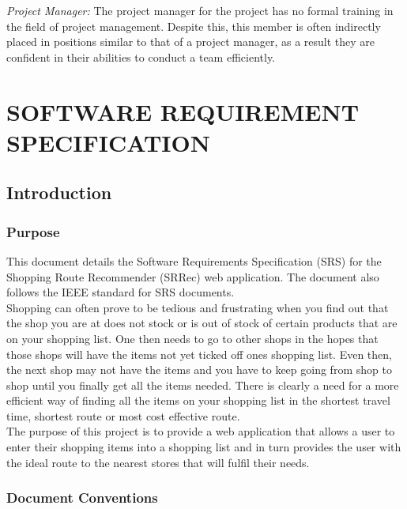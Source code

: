 \documentclass[10pt,twocolumn]{witseiepaper}
\begin{document}
		\textit{Project Manager:} The project manager for the project has no formal training in the field of project management. Despite this, this member is often indirectly placed in positions similar to that of a project manager, as a result they are confident in their abilities to conduct a team efficiently. \\

\section{SOFTWARE REQUIREMENT SPECIFICATION}
	
		\subsection{Introduction}
		
		\subsubsection{Purpose}
		
		This document details the Software Requirements Specification (SRS) for the Shopping Route Recommender (SRRec) web application. The document also follows the IEEE standard for SRS documents.\\
		
		Shopping can often prove to be tedious and frustrating when you find out that the shop you are at does not stock or is out of stock of certain products that are on your shopping list. One then needs to go to other shops in the hopes that those shops will have the items not yet ticked off ones shopping list. Even then, the next shop may not have the items and you have to keep going from shop to shop until you finally get all the items needed. There is clearly a need for a more efficient way of finding all the items on your shopping list in the shortest travel time, shortest route or most cost effective route.\\
		
		The purpose of this project is to provide a web application that allows a user to enter their shopping items into a shopping list and in turn provides the user with the ideal route to the nearest stores that will fulfil their needs.
		
		\subsubsection{Document Conventions}
		
\end{document}
